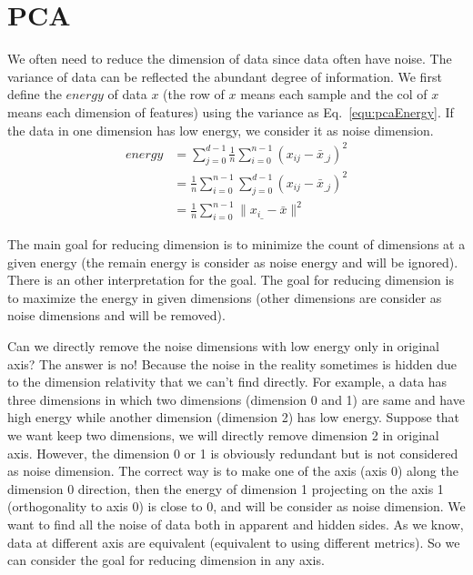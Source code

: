 \documentclass[runningheads,openany]{xhlPaper}
\begin{document}
\section{PCA}
We often need to reduce the dimension of data since data often have noise. 
The variance of data can be reflected the abundant degree of information. We first define the $energy$ of data $x$ (the row of $x$ means each sample and the col of $x$ means each dimension of features) using the variance as Eq.~\ref{equ:pcaEnergy}. If the data in one dimension has low energy, we consider it as noise dimension.
\begin{equation}
\label{equ:pcaEnergy}
\begin{aligned}
energy &= \sum\limits_{j = 0}^{d - 1} {\frac{1}{n}\sum\limits_{i = 0}^{n - 1} {{{\left( {{x_{ij}} - {{\bar x}_{\_j}}} \right)}^2}} }\\
 &= \frac{1}{n}\sum\limits_{i = 0}^{n - 1} {\sum\limits_{j = 0}^{d - 1} {{{\left( {{x_{ij}} - {{\bar x}_{\_j}}} \right)}^2}} }\\
 &= \frac{1}{n}\sum\limits_{i = 0}^{n - 1} {\parallel {x_{i\_}} - \bar x{\parallel ^2}} 
\end{aligned}
\end{equation}

The main goal for reducing dimension is to minimize the count of dimensions at a given energy (the remain energy is consider as noise energy and will be ignored). There is an other interpretation for the goal. The goal for reducing dimension is to maximize the energy in given dimensions (other dimensions are consider as noise dimensions and will be removed).

Can we directly remove the noise dimensions with low energy only in original axis? The answer is no! Because the noise in the reality sometimes is hidden due to the dimension relativity that we can't find directly. For example, a data has three dimensions in which two dimensions (dimension 0 and 1) are same and have high energy while another dimension (dimension 2) has low energy. Suppose that we want keep two dimensions, we will directly remove dimension 2 in original axis. However, the dimension 0 or 1 is obviously redundant but is not considered as noise dimension. The correct way is to make one of the axis (axis 0) along the dimension 0 direction, then the energy of dimension 1 projecting on the axis 1 (orthogonality to axis 0) is close to 0, and will be consider as noise dimension. We want to find all the noise of data both in apparent and hidden sides. 
As we know, data at different axis are equivalent (equivalent to using different metrics). So we can consider the goal for reducing dimension in any axis.
\end{document}
